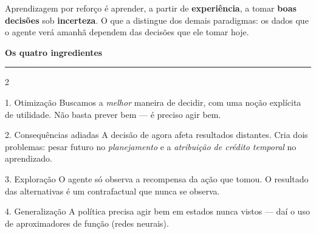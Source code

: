 \documentclass[10pt, a4paper]{article}
\newcounter{secao}
\newcommand{\secao}[1]{%
  \stepcounter{secao}%
  \vspace{0.7em}%
  \noindent{\color{rlLaranja}\rule{1.6em}{2pt}}\hspace{0.5em}%
  {\color{rlCinza}\footnotesize\bfseries\thesecao}\hspace{0.35em}%
  {\color{rlAzul}\large\bfseries #1}%
  \par\vspace{-0.15em}%
  {\color{rlAzul!22}\rule{\linewidth}{0.6pt}}%
  \par\vspace{0.25em}}
\begin{document}
\vspace*{1.55cm}

\begin{chave}
Aprendizagem por reforço é aprender, a partir de \textbf{experiência}, a tomar
\textbf{boas decisões} sob \textbf{incerteza}. O que a distingue dos demais
paradigmas: os dados que o agente verá amanhã dependem das decisões que ele
tomar hoje.
\end{chave}

\secao{Os quatro ingredientes}

\begin{multicols}{2}
\begin{ingr}{1. Otimização}
Buscamos a \emph{melhor} maneira de decidir, com uma noção explícita de
utilidade. Não basta prever bem — é preciso agir bem.
\end{ingr}

\begin{ingr}{2. Consequências adiadas}
A decisão de agora afeta resultados distantes. Cria dois problemas: pesar
futuro no \emph{planejamento} e a \emph{atribuição de crédito temporal} no
aprendizado.
\end{ingr}

\columnbreak

\begin{ingr}{3. Exploração}
O agente só observa a recompensa da ação que tomou. O resultado das
alternativas é um contrafactual que nunca se observa.
\end{ingr}

\begin{ingr}{4. Generalização}
A política precisa agir bem em estados nunca vistos — daí o uso de
aproximadores de função (redes neurais).
\end{ingr}
\end{multicols}
\end{document}
